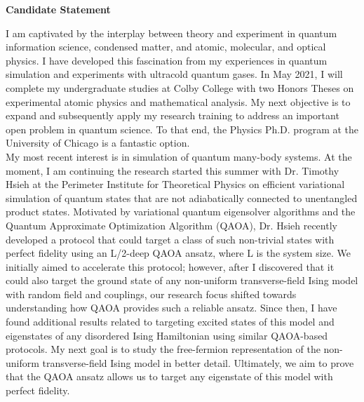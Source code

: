 \documentclass[12pt]{article}
\begin{document}
\begin{center}
	\textbf{Candidate Statement}
\end{center}
I am captivated by the interplay between theory and experiment in quantum information science, condensed matter, and atomic, molecular, and optical physics. I have developed this fascination from my experiences in quantum simulation and experiments with ultracold quantum gases. In May 2021, I will complete my undergraduate studies at Colby College with two Honors Theses on experimental atomic physics and mathematical analysis. My next objective is to expand and subsequently apply my research training to address an important open problem in quantum science. To that end, the Physics Ph.D. program at the University of Chicago is a fantastic option.  \\ 

My most recent interest is in simulation of quantum many-body systems. At the moment, I am continuing the research started this summer with Dr. Timothy Hsieh at the Perimeter Institute for Theoretical Physics on efficient variational simulation of quantum states that are not adiabatically connected to unentangled product states. Motivated by variational quantum eigensolver algorithms and the Quantum Approximate Optimization Algorithm (QAOA), Dr. Hsieh recently developed a protocol that could target a class of such non-trivial  states with perfect fidelity using an L/2-deep QAOA ansatz, where L is the system size. We initially aimed to accelerate this protocol; however, after I discovered that it could also target the ground state of any non-uniform transverse-field Ising model with random field and couplings, our research focus shifted towards understanding how QAOA provides such a reliable ansatz. Since then, I have found additional results related to targeting excited states of this model and eigenstates of any disordered Ising Hamiltonian using similar QAOA-based protocols. My next goal is to study the free-fermion representation of the non-uniform transverse-field Ising model in better detail. Ultimately, we aim to prove that the QAOA ansatz allows us to target any eigenstate of this model with perfect fidelity. \\
\end{document}
